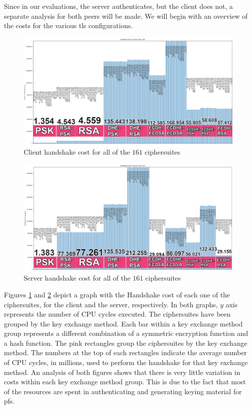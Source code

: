 Since in our evaluations, the server authenticates, but the client does not,
a separate analysis for both peers will be made. We will begin with an overview of the costs for the various \gls{tls}
configurations.

\begin{figure}
  \centering
  \includegraphics[width=1.0\textwidth]{img/hs_cost_cli.png}
  \centering \caption{\label{fig:hs-all-ciphers-cli} Client handshake cost for all of the $161$ ciphersuites}
\end{figure}

\begin{figure}
  \centering
  \includegraphics[width=1.0\textwidth]{img/hs_cost_srv.png}
  \centering \caption{\label{fig:hs-all-ciphers-srv} Server handshake cost for all of the $161$ ciphersuites}
\end{figure}

Figures \ref{fig:hs-all-ciphers-cli} and \ref{fig:hs-all-ciphers-srv} depict a graph with the Handshake cost of each one
of the ciphersuites, for the client and the server, respectively. In both graphs, $y$ axis represents the number of
CPU cycles executed. The ciphersuites have been grouped by the key exchange method. Each bar within a key
exchange method group represents a different combination of a symmetric encryption function and a hash function.
The pink rectangles group the ciphersuites by the key exchange method. The numbers at the top of each rectangles indicate the average
number of CPU  cycles, in millions, used to perform the handshake for that key exchange method.
An analysis of both figures shows that there is very little variation in costs within
each key exchange method group. This is due to the fact that most of the resources are spent in authenticating and
generating keying material for \gls{pfs}.

